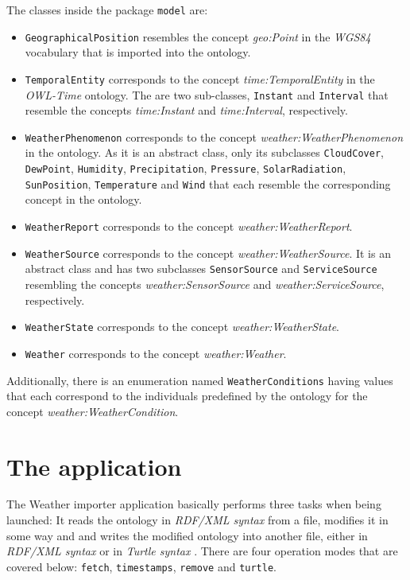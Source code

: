 The classes inside the package \texttt{model} are:
\begin{itemize}
  \item \texttt{GeographicalPosition} resembles the concept \emph{geo:Point} in the \emph{WGS84} vocabulary that is imported into the \thinkhomeweather ontology.
  \item \texttt{TemporalEntity} corresponds to the concept \emph{time:TemporalEntity} in the \emph{OWL-Time} ontology. The are two sub-classes, \texttt{Instant} and \texttt{Interval} that resemble the concepts \emph{time:Instant} and \emph{time:Interval}, respectively.
  \item \texttt{WeatherPhenomenon} corresponds to the concept \emph{weather:WeatherPhenomenon} in the \thinkhomeweather ontology. As it is an abstract class, only its subclasses \texttt{CloudCover}, \texttt{DewPoint}, \texttt{Humidity}, \texttt{Precipitation}, \texttt{Pressure}, \texttt{SolarRadiation}, \texttt{SunPosition}, \texttt{Temperature} and \texttt{Wind} that each resemble the corresponding concept in the ontology.
  \item \texttt{WeatherReport} corresponds to the concept \emph{weather:WeatherReport}.
  \item \texttt{WeatherSource} corresponds to the concept \emph{weather:WeatherSource}. It is an abstract class and has two subclasses \texttt{SensorSource} and \texttt{ServiceSource} resembling the concepts \emph{weather:SensorSource} and \emph{weather:ServiceSource}, respectively.
  \item \texttt{WeatherState} corresponds to the concept \emph{weather:WeatherState}.
  \item \texttt{Weather} corresponds to the concept \emph{weather:Weather}.
\end{itemize}

Additionally, there is an enumeration named \texttt{WeatherConditions} having values that each correspond to the individuals predefined by the ontology for the concept \emph{weather:WeatherCondition}.

\section{The application}
\label{sec:importer_application}

The Weather importer application basically performs three tasks when being launched: It reads the \thinkhomeweather ontology in \emph{RDF/XML syntax}\cite{RDF_XML} from a file, modifies it in some way and and writes the modified ontology into another file, either in \emph{RDF/XML syntax} or in \emph{Turtle syntax} \cite{Turtle}. There are four operation modes that are covered below: \texttt{fetch}, \texttt{timestamps}, \texttt{remove} and \texttt{turtle}.

